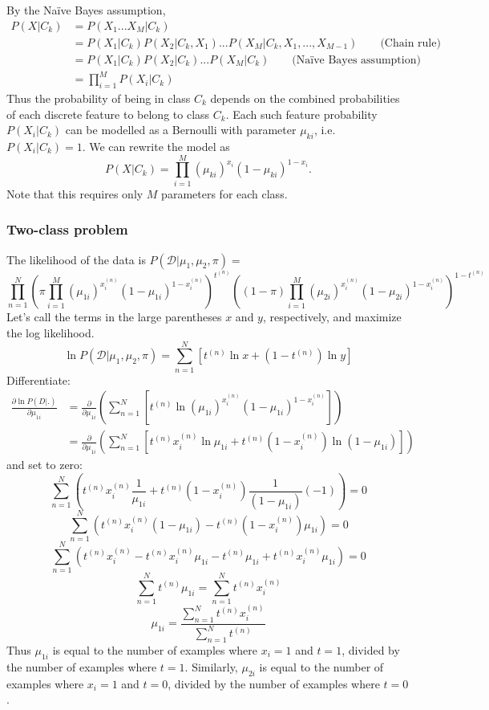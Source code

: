 \documentclass[a4paper,12pt]{article}
\begin{document}
By the Naïve Bayes assumption, 
\begin{align*}
P(X|C_k) &= P(X_1...X_M|C_k) \\
		 &= P(X_1|C_k)P(X_2|C_k, X_1)...P(X_M|C_k, X_1,...,X_{M-1}) \qquad\text{(Chain rule)} \\
		 &= P(X_1|C_k)P(X_2|C_k)...P(X_M|C_k) \qquad\text{(Naïve Bayes assumption)} \\
		 &= \prod_{i=1}^M P(X_i|C_k)
\end{align*}
Thus the probability of being in class $C_k$ depends on the combined probabilities of each discrete feature to belong to class $C_k$. Each such feature probability $P(X_i|C_k)$ can be modelled as a Bernoulli with parameter $\mu_{ki}$, i.e. $P(X_i|C_k)=1$. We can rewrite the model as
$$P(X|C_k) = \prod_{i=1}^M (\mu_{ki})^{x_i}(1-\mu_{ki})^{1-x_i}.$$
Note that this requires only $M$ parameters for each class. 

\subsubsection{Two-class problem}

The likelihood of the data is $P(\mathcal{D}|\mu_1, \mu_2, \pi) = $
$$\prod_{n=1}^N \left(\pi \prod_{i=1}^M (\mu_{1i})^{x_i^{(n)}}(1-\mu_{1i})^{1-x_i^{(n)}}\right)^{t^{(n)}} \left((1-\pi) \prod_{i=1}^M (\mu_{2i})^{x_i^{(n)}}(1-\mu_{2i})^{1-x_i^{(n)}}\right)^{1-t^{(n)}}$$
Let's call the terms in the large parentheses $x$ and $y$, respectively, and maximize the log likelihood. 
$$\ln P(\mathcal{D}|\mu_1, \mu_2, \pi) = \sum_{n=1}^N \left[t^{(n)} \ln x + (1-t^{(n)})\ln y\right]$$
Differentiate: 
\begin{align*}
\frac{\partial\ln P(D|.)}{\partial\mu_{1i}} 
&= \frac{\partial}{\partial\mu_{1i}} \left( \sum_{n=1}^N \left[ t^{(n)} \ln (\mu_{1i})^{x_i^{(n)}} (1-\mu_{1i})^{1-x_i^{(n)}} \right] \right) \\
&= \frac{\partial}{\partial\mu_{1i}} \left( \sum_{n=1}^N \left[ t^{(n)}x_i^{(n)}\ln\mu_{1i} + t^{(n)}(1-x_i^{(n)})\ln(1-\mu_{1i})\right] \right)
\end{align*}
and set to zero: 
$$\sum_{n=1}^N \left( t^{(n)}x_i^{(n)}\frac{1}{\mu_{1i}} + t^{(n)}(1-x_i^{(n)})\frac{1}{(1-\mu_{1i})}(-1)\right) = 0$$
$$\sum_{n=1}^N \left( t^{(n)}x_i^{(n)}(1-\mu_{1i}) - t^{(n)}(1-x_i^{(n)})\mu_{1i}\right) = 0$$
$$\sum_{n=1}^N \left( t^{(n)}x_i^{(n)} - t^{(n)}x_i^{(n)}\mu_{1i} - t^{(n)}\mu_{1i} + t^{(n)}x_i^{(n)}\mu_{1i}\right) = 0$$
$$\sum_{n=1}^N t^{(n)}\mu_{1i} = \sum_{n=1}^N t^{(n)}x_i^{(n)}$$
$$\mu_{1i} = \frac{\sum_{n=1}^N t^{(n)}x_i^{(n)}}{\sum_{n=1}^N t^{(n)}}$$
Thus $\mu_{1i}$ is equal to the number of examples where $x_i=1$ and $t=1$, divided by the number of examples where $t=1$. Similarly, $\mu_{2i}$ is equal to the number of examples where $x_i=1$ and $t=0$, divided by the number of examples where $t=0$. 
\end{document}
